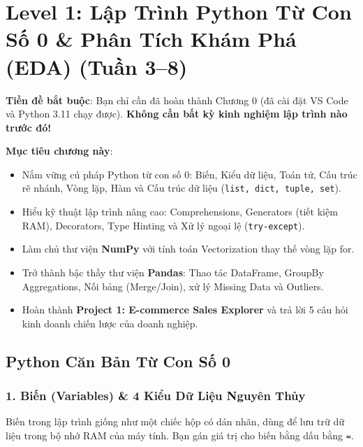 \chapter{Level 1: Lập Trình Python Từ Con Số 0 \& Phân Tích Khám Phá (EDA) (Tuần 3--8)}

\begin{lythuyetbox}
\textbf{Tiền đề bắt buộc}: Bạn chỉ cần đã hoàn thành Chương 0 (đã cài đặt VS Code và Python 3.11 chạy được). \textbf{Không cần bất kỳ kinh nghiệm lập trình nào trước đó!}

\textbf{Mục tiêu chương này}:
\begin{itemize}
    \item Nắm vững cú pháp Python từ con số 0: Biến, Kiểu dữ liệu, Toán tử, Cấu trúc rẽ nhánh, Vòng lặp, Hàm và Cấu trúc dữ liệu (\texttt{list, dict, tuple, set}).
    \item Hiểu kỹ thuật lập trình nâng cao: Comprehensions, Generators (tiết kiệm RAM), Decorators, Type Hinting và Xử lý ngoại lệ (\texttt{try-except}).
    \item Làm chủ thư viện \textbf{NumPy} với tính toán Vectorization thay thế vòng lặp for.
    \item Trở thành bậc thầy thư viện \textbf{Pandas}: Thao tác DataFrame, GroupBy Aggregations, Nối bảng (Merge/Join), xử lý Missing Data và Outliers.
    \item Hoàn thành \textbf{Project 1: E-commerce Sales Explorer} và trả lời 5 câu hỏi kinh doanh chiến lược của doanh nghiệp.
\end{itemize}
\end{lythuyetbox}

\section{Python Căn Bản Từ Con Số 0}

\subsection{1. Biến (Variables) \& 4 Kiểu Dữ Liệu Nguyên Thủy}

Biến trong lập trình giống như một chiếc hộp có dán nhãn, dùng để lưu trữ dữ liệu trong bộ nhớ RAM của máy tính. Bạn gán giá trị cho biến bằng dấu bằng \texttt{=}.

